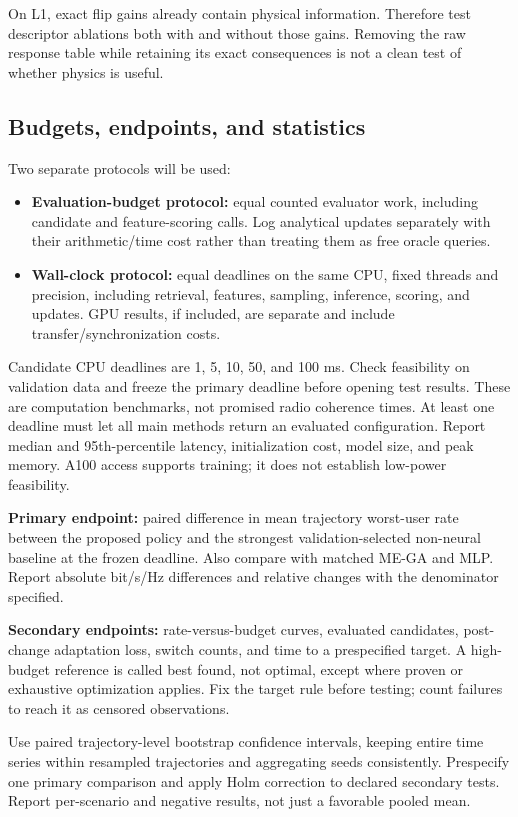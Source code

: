 \documentclass[conference]{IEEEtran}
\begin{document}
On L1, exact flip gains already contain physical information. Therefore test descriptor ablations both with and without those gains. Removing the raw response table while retaining its exact consequences is not a clean test of whether physics is useful.

\subsection{Budgets, endpoints, and statistics}
Two separate protocols will be used:
\begin{itemize}
\item \textbf{Evaluation-budget protocol:} equal counted evaluator work, including candidate and feature-scoring calls. Log analytical updates separately with their arithmetic/time cost rather than treating them as free oracle queries.
\item \textbf{Wall-clock protocol:} equal deadlines on the same CPU, fixed threads and precision, including retrieval, features, sampling, inference, scoring, and updates. GPU results, if included, are separate and include transfer/synchronization costs.
\end{itemize}
Candidate CPU deadlines are 1, 5, 10, 50, and 100 ms. Check feasibility on validation data and freeze the primary deadline before opening test results. These are computation benchmarks, not promised radio coherence times. At least one deadline must let all main methods return an evaluated configuration. Report median and 95th-percentile latency, initialization cost, model size, and peak memory. A100 access supports training; it does not establish low-power feasibility.

\textbf{Primary endpoint:} paired difference in mean trajectory worst-user rate between the proposed policy and the strongest validation-selected non-neural baseline at the frozen deadline. Also compare with matched ME-GA and MLP. Report absolute bit/s/Hz differences and relative changes with the denominator specified.

\textbf{Secondary endpoints:} rate-versus-budget curves, evaluated candidates, post-change adaptation loss, switch counts, and time to a prespecified target. A high-budget reference is called best found, not optimal, except where proven or exhaustive optimization applies. Fix the target rule before testing; count failures to reach it as censored observations.

Use paired trajectory-level bootstrap confidence intervals, keeping entire time series within resampled trajectories and aggregating seeds consistently. Prespecify one primary comparison and apply Holm correction to declared secondary tests. Report per-scenario and negative results, not just a favorable pooled mean.
\end{document}
